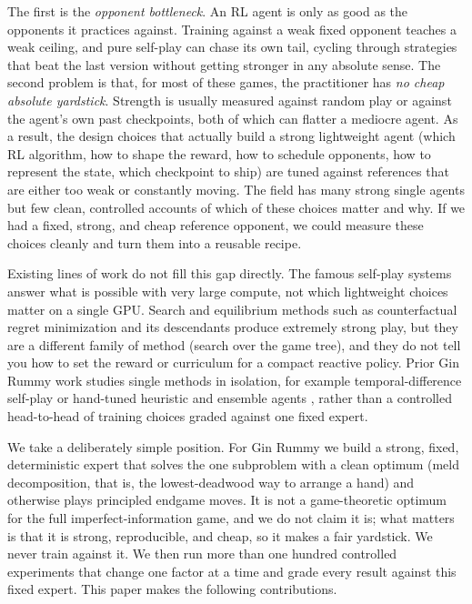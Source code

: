 \documentclass[letterpaper]{article} %
\begin{document}
The first is the \emph{opponent bottleneck}. An RL agent is only as good as the
opponents it practices against. Training against a weak fixed opponent teaches a
weak ceiling, and pure self-play can chase its own tail, cycling through
strategies that beat the last version without getting stronger in any absolute
sense. The second problem is that, for most of these games, the practitioner has
\emph{no cheap absolute yardstick}. Strength is usually measured against random
play or against the agent's own past checkpoints, both of which can flatter a
mediocre agent. As a result, the design choices that actually build a strong
lightweight agent (which RL algorithm, how to shape the reward, how to schedule
opponents, how to represent the state, which checkpoint to ship) are tuned
against references that are either too weak or constantly moving. The field has
many strong single agents but few clean, controlled accounts of which of these
choices matter and why. If we had a fixed, strong, and cheap reference opponent,
we could measure these choices cleanly and turn them into a reusable recipe.

Existing lines of work do not fill this gap directly. The famous self-play
systems \citep{alphazero,alphastar,openaifive} answer what is possible with very
large compute, not which lightweight choices matter on a single GPU. Search and
equilibrium methods such as counterfactual regret minimization and its
descendants \citep{cfr,libratus,deepcfr} produce extremely strong play, but they
are a different family of method (search over the game tree), and they do not
tell you how to set the reward or curriculum for a compact reactive policy.
Prior Gin Rummy work studies single methods in isolation, for example
temporal-difference self-play \citep{tdrummy} or hand-tuned heuristic and
ensemble agents \citep{ginensemble}, rather than a controlled head-to-head of
training choices graded against one fixed expert.

We take a deliberately simple position. For Gin Rummy we build a strong, fixed,
deterministic expert that solves the one subproblem with a clean optimum (meld
decomposition, that is, the lowest-deadwood way to arrange a hand) and otherwise
plays principled endgame moves. It is not a game-theoretic optimum for the full
imperfect-information game, and we do not claim it is; what matters is that it is
strong, reproducible, and cheap, so it makes a fair yardstick. We never train
against it. We then run more than one hundred controlled experiments that change
one factor at a time and grade every result against this fixed expert. This
paper makes the following contributions.
\end{document}
